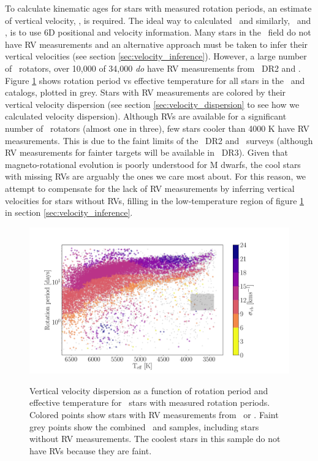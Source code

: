 To calculate kinematic ages for stars with measured rotation periods, an
estimate of vertical velocity, \vz, is required.
The ideal way to calculated \vz\, and similarly, \vx\ and \vy, is to use 6D
positional and velocity information.
Many stars in the \kepler\ field do not have RV measurements and an
alternative approach must be taken to infer their vertical velocities (see
section \ref{sec:velocity_inference}).
However, a large number of \kepler\ rotators, over 10,000 of 34,000 {\it do}
have RV measurements from \gaia\ DR2 and \lamost.
Figure \ref{fig:existing_rvs} shows rotation period vs effective temperature
for all stars in the \mct\ and \citet{santos2019} catalogs, plotted in grey.
Stars with RV measurements are colored by their vertical velocity dispersion
(see section \ref{sec:velocity_dispersion} to see how we calculated velocity
dispersion).
Although RVs are available for a significant number of \kepler\ rotators
(almost one in three), few stars cooler than 4000 K have RV measurements.
This is due to the faint limits of the \gaia\ DR2 and \lamost\ surveys
(although RV measurements for fainter targets will be available in \gaia\
DR3).
Given that magneto-rotational evolution is poorly understood for M dwarfs, the
cool stars with missing RVs are arguably the ones we care most about.
For this reason, we attempt to compensate for the lack of RV measurements by
inferring vertical velocities for stars without RVs, filling in the
low-temperature region of figure \ref{fig:existing_rvs} in section
\ref{sec:velocity_inference}.
\begin{figure}[ht!]
\caption{
Vertical velocity dispersion as a function of rotation period and effective
    temperature for \kepler\ stars with measured rotation periods.
Colored points show stars with RV measurements from \gaia\ or \lamost.
Faint grey points show the combined \mct\ and \citet{santos2019} samples,
    including stars without RV measurements.
The coolest stars in this sample do not have RVs because they are faint.
}
  \centering
    \includegraphics[width=1\textwidth]{existing_rvs}
\label{fig:existing_rvs}
\end{figure}


